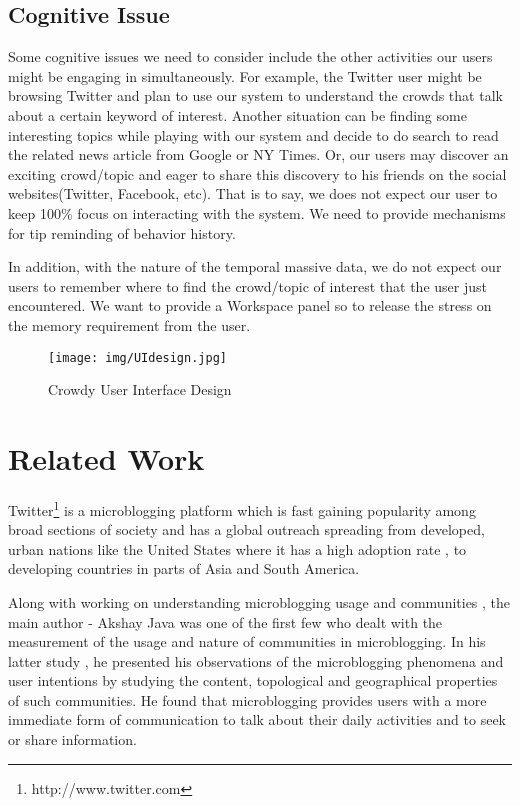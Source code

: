 \documentclass{sig-alternate}
\begin{document}
\subsection{Cognitive Issue}
Some cognitive issues we need to consider include the other activities our
users might be engaging in simultaneously. For example, the Twitter user might
be browsing Twitter and plan to use our system to understand the crowds that
talk about a certain keyword of interest. Another situation can be finding some
interesting topics while playing with our system and decide to do search to
read the related news article from Google or NY Times. Or, our users may
discover an exciting crowd/topic and eager to share this discovery to his
friends on the social websites(Twitter, Facebook, etc). That is to say, we does
not expect our user to keep 100\% focus on interacting with the system. We need
to provide mechanisms for tip reminding of behavior history. 

In addition, with the nature of the temporal massive data, we do not expect our
users to remember where to find the crowd/topic of interest that the user just
encountered. We want to provide a Workspace panel so to release the stress on
the memory requirement from the user.

\begin{figure*}[t]
\centering
\texttt{[image: img/UIdesign.jpg]}
\caption{Crowdy User Interface Design}
\label{fig:UIdesign}
\end{figure*}

\section{Related Work}
Twitter\footnote{http://www.twitter.com} is a microblogging platform which is
fast gaining popularity\cite{Oreilly:2009} among broad sections of society and
has a global outreach spreading from developed, urban nations like the United
States where it has a high adoption rate \cite{Java:2007}, to developing
countries in parts of Asia and South America.

Along with working on understanding microblogging usage and communities
\cite{Java:2007}, the main author - Akshay Java was one of the first few who
dealt with the measurement of the usage and nature of communities in
microblogging. In his latter study \cite{Java:2008}, he presented his
observations of the microblogging phenomena and user intentions by studying the
content, topological and geographical properties of such communities. He found
that microblogging provides users with a more immediate form of communication
to talk about their daily activities and to seek or share information.
\end{document}
